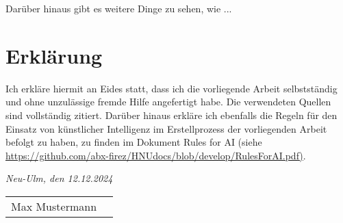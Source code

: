 \documentclass[12pt, a4paper, twoside]{article} %
\newcommand*{\getAuthor}{Max Mustermann}
\begin{document}
Darüber hinaus gibt es weitere Dinge zu sehen, wie ... 


\newpage
\section*{Erklärung} %
Ich erkläre hiermit an Eides statt, dass ich die vorliegende Arbeit selbstständig und ohne unzulässige fremde Hilfe angefertigt habe. Die verwendeten Quellen sind vollständig zitiert. Darüber hinaus erkläre ich ebenfalls die Regeln für den Einsatz von künstlicher Intelligenz im Erstellprozess der vorliegenden Arbeit befolgt zu haben, zu finden im Dokument Rules for AI (siehe \url{https://github.com/abx-firez/HNUdocs/blob/develop/RulesForAI.pdf)}.
\bigskip
 
\textit{Neu-Ulm, den 12.12.2024}

\smallskip

\begin{flushright}
    \begin{tabular}{cc}
        \\ \hline
        \centering 
        \getAuthor 
    \end{tabular}
\end{flushright}
\end{document}
